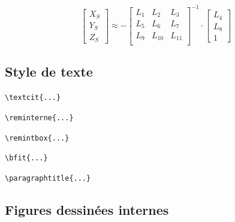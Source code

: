 \begin{equation*}
    \begin{bmatrix}
        X_S\\Y_S\\Z_S
    \end{bmatrix}\approx -
    \begin{bmatrix}
        L_1&L_2&L_3\\
        L_5&L_6&L_7\\
        L_9&L_{10}&L_{11}\\
    \end{bmatrix}^{-1}\cdot 
    \begin{bmatrix}
        L_4\\L_8\\1
    \end{bmatrix}
\end{equation*}

\subsection{Style de texte}

\verb|\textcit{...}|


\verb|\reminterne{...}|


\verb|\remintbox{...}|


\verb|\bfit{...}|


\verb|\paragraphtitle{...}|


\subsection{Figures dessinées internes}

